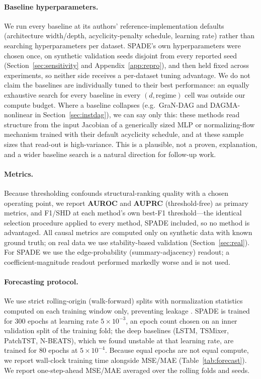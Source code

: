 \paragraph{Baseline hyperparameters.} We run every baseline at its authors'
reference-implementation defaults (architecture width/depth, acyclicity-penalty
schedule, learning rate) rather than searching hyperparameters per dataset.
SPADE's own hyperparameters were chosen once, on synthetic validation seeds
disjoint from every reported seed (Section~\ref{sec:sensitivity} and
Appendix~\ref{app:repro}), and then held fixed across experiments, so neither
side receives a per-dataset tuning advantage. We do not claim the baselines are
individually tuned to their best performance: an equally exhaustive search for
every baseline in every $(d,\text{regime})$ cell was outside our compute budget.
Where a baseline collapses (e.g.\ GraN-DAG and DAGMA-nonlinear in
Section~\ref{sec:instdag}), we can say only this: these methods read structure
from the input Jacobian of a generically sized MLP or normalizing-flow mechanism
trained with their default acyclicity schedule, and at these sample sizes that
read-out is high-variance. This is a plausible, not a proven, explanation, and a
wider baseline search is a natural direction for follow-up work.

\paragraph{Metrics.} Because thresholding confounds structural-ranking quality
with a chosen operating point, we report \textbf{AUROC} and \textbf{AUPRC}
(threshold-free) as primary metrics, and F1/SHD at each method's own best-F1
threshold---the identical selection procedure applied to every method, SPADE
included, so no method is advantaged. All causal metrics are computed only on
synthetic data with known ground truth; on real data we use stability-based
validation (Section~\ref{sec:real}). For SPADE we use the edge-probability
(summary-adjacency) readout; a coefficient-magnitude readout performed markedly
worse and is not used.

\paragraph{Forecasting protocol.} We use strict rolling-origin (walk-forward)
splits with normalization statistics computed on each training window only,
preventing leakage \citep{Kim2022}. SPADE is trained for 300 epochs at learning
rate $5\times10^{-3}$, an epoch count chosen on an inner validation split of the
training fold; the deep baselines (LSTM, TSMixer, PatchTST, N-BEATS), which we
found unstable at that learning rate, are trained for 80 epochs at
$5\times10^{-4}$. Because equal epochs are not equal compute, we report
wall-clock training time alongside MSE/MAE (Table~\ref{tab:forecast}). We report
one-step-ahead MSE/MAE averaged over the rolling folds and seeds.

